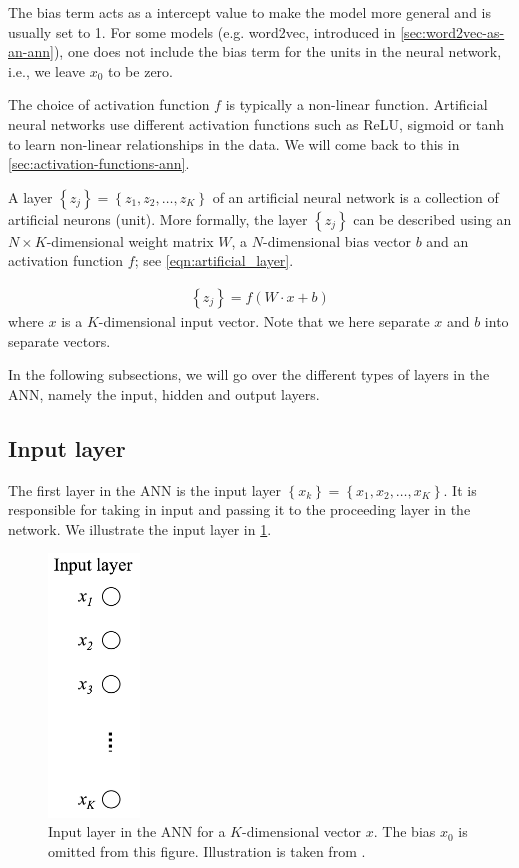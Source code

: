 The bias term acts as a intercept value to make the model more general and is usually set to 1. For some models (e.g. word2vec, introduced in \cref{sec:word2vec-as-an-ann}), one does not include the bias term for the units in the neural network, i.e., we leave $x_0$ to be zero.

The choice of activation function $f$ is typically a non-linear function. Artificial neural networks use different activation functions such as ReLU, sigmoid or tanh to learn non-linear relationships in the data. We will come back to this in \cref{sec:activation-functions-ann}.

\newcommand{\layer}[2]{\left\{ {#1}_{#2} \right\}}

\begin{definition}
\label{def:layer_ann}
A layer $\layer{z}{j} = \left\{ z_1, z_2, \ldots, z_K \right\}$ of an artificial neural network is a collection of artificial neurons (unit). More formally, the layer $\layer{z}{j}$ can be described using an $N \times K$-dimensional weight matrix $W$, a $N$-dimensional bias vector $b$ and an activation function $f$; see \cref{eqn:artificial_layer}.
\end{definition}

\begin{align}
    \layer{z}{j} = f \left( W \cdot x + b \right)
    \label{eqn:artificial_layer}
\end{align}
where $x$ is a $K$-dimensional input vector. Note that we here separate $x$ and $b$ into separate vectors.

In the following subsections, we will go over the different types of layers in the ANN, namely the input, hidden and output layers.

\subsection{Input layer}
The first layer in the ANN is the input layer $\layer{x}{k} = \left\{ x_1, x_2, \ldots, x_K \right\}$. It is responsible for taking in input and passing it to the proceeding layer in the network. We illustrate the input layer in \cref{fig:input_layer_ann}.

\begin{figure}[H]
    \centering
    \includegraphics[height=7cm]{thesis/figures/ann-input-layer-rong-2014.png}
    \caption{Input layer in the ANN for a $K$-dimensional vector $x$. The bias $x_0$ is omitted from this figure. Illustration is taken from \cite[Figure 6]{rong2016word2vec}.}
    \label{fig:input_layer_ann}
\end{figure}

